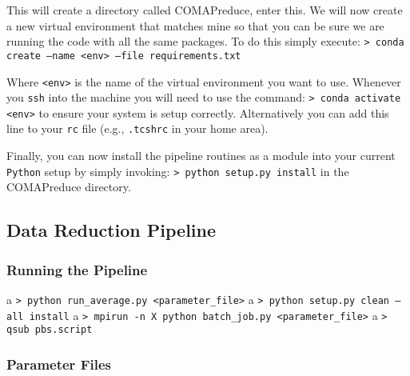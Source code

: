 \documentclass[11pt]{article}
\begin{document}
This will create a directory called COMAPreduce, enter this. We will now create a new virtual environment that matches mine so that you can be sure we are running the code with all the same packages. To do this simply execute:
\newline\noindent
\texttt{> conda create --name <env> --file requirements.txt}
\newline\noindent

Where \texttt{<env>} is the name of the virtual environment you want to use. Whenever you \texttt{ssh} into the machine you will need to use the command:
\newline\noindent
\texttt{> conda activate <env>}
\newline\noindent
to ensure your system is setup correctly. Alternatively you can add this line to your \texttt{rc} file (e.g., \texttt{.tcshrc} in your home area).

Finally, you can now install the pipeline routines as a module into your current \texttt{Python} setup by simply invoking:
\newline\noindent
\texttt{> python setup.py install}
\newline\noindent
in the COMAPreduce directory. 

\subsection{Data Reduction Pipeline}

\subsubsection{Running the Pipeline}
a
\newline\noindent
\texttt{> python run\_average.py <parameter\_file>}
\newline\noindent
a
\newline\noindent
\texttt{> python setup.py clean --all install}
\newline\noindent
a
\newline\noindent
\texttt{> mpirun -n X python batch\_job.py <parameter\_file>}
\newline\noindent
a
\newline\noindent
\texttt{> qsub pbs.script}
\newline\noindent

\subsubsection{Parameter Files}
\end{document}
